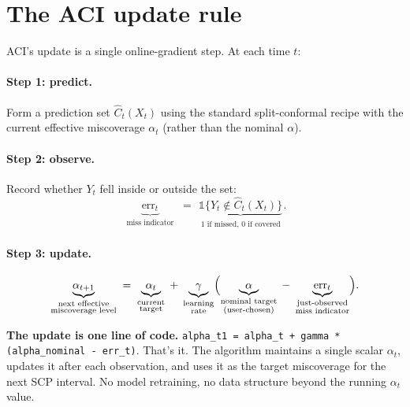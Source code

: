 \documentclass[letterpaper,11pt,leqno]{article}
\begin{document}
\section{The ACI update rule}\label{s:construction}

ACI's update is a single online-gradient step. At each time $t$:

\paragraph{Step 1: predict.} Form a prediction set $\hat{C}_t(X_t)$ using the standard split-conformal recipe with the current effective miscoverage $\alpha_t$ (rather than the nominal $\alpha$).

\paragraph{Step 2: observe.} Record whether $Y_t$ fell inside or outside the set:
\begin{equation*}
\underbrace{\text{err}_t}_{\substack{\text{miss indicator}}}
\;=\;
\underbrace{\mathbb{1}\{Y_t \notin \hat{C}_t(X_t)\}}_{\substack{\text{1 if missed, 0 if covered}}}.
\end{equation*}

\paragraph{Step 3: update.}
\begin{equation*}
\underbrace{\alpha_{t+1}}_{\substack{\text{next effective}\\\text{miscoverage level}}}
\;=\;
\underbrace{\alpha_t}_{\substack{\text{current}\\\text{target}}}
\;+\;
\underbrace{\gamma}_{\substack{\text{learning}\\\text{rate}}}
\Bigl(
\underbrace{\alpha}_{\substack{\text{nominal target}\\\text{(user-chosen)}}}
\;-\;
\underbrace{\text{err}_t}_{\substack{\text{just-observed}\\\text{miss indicator}}}
\Bigr).
\end{equation*}

\begin{algorithmexplain}
\textbf{The update is one line of code.} \texttt{alpha\_t1 = alpha\_t + gamma * (alpha\_nominal - err\_t)}. That's it. The algorithm maintains a single scalar $\alpha_t$, updates it after each observation, and uses it as the target miscoverage for the next SCP interval. No model retraining, no data structure beyond the running $\alpha_t$ value.
\end{algorithmexplain}
\end{document}
